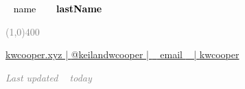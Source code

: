 \documentclass[11pt]{result/developercv} %
\begin{document}
	
	

\begin{center}
\HUGE\textcolor{black}{~{{ name }}~}
\HUGE\textcolor{black}{\textbf{~{{ lastName }}~}}
\end{center}

\begin{center}
\textcolor{gray}{\line(1,0){400}}
\end{center}

\begin{center}
\footnotesize 
\href{https://kwcooper.xyz}{\faHome \hspace{0.05cm} kwcooper.xyz | \hspace{0.1cm}}
\href{https://twitter.com/kwcooper}{\faTwitter \hspace{0.05cm} @keilandwcooper | \hspace{0.1cm}} 
\href{mailto: ~{{ email }}~ }{\faEnvelope \hspace{0.05cm} ~{{ email }}~ | \hspace{0.1cm}} 
\href{https://github.com/kwcooper}{\faGithub \hspace{0.05cm} kwcooper} 
\end{center}

\begin{center} \footnotesize \emph{\textcolor{gray}{Last updated ~{{ today }}~}} \end{center}
\vspace{0.7cm}


\end{document}
